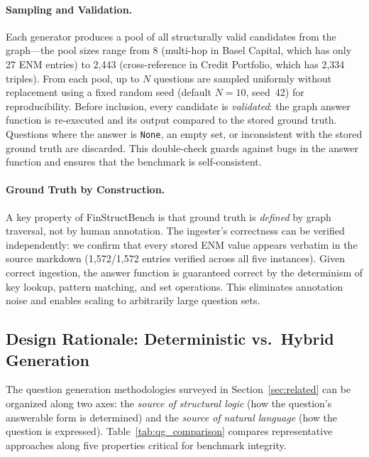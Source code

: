 \documentclass[11pt]{article}
\begin{document}
\paragraph{Sampling and Validation.}
Each generator produces a pool of all structurally valid candidates from
the graph---the pool sizes range from 8 (multi-hop in Basel Capital,
which has only 27 ENM entries) to 2{,}443 (cross-reference in Credit
Portfolio, which has 2{,}334 triples).  From each pool, up to $N$
questions are sampled uniformly without replacement using a fixed random
seed (default $N=10$, seed~42) for reproducibility.  Before inclusion,
every candidate is \emph{validated}: the graph answer function is
re-executed and its output compared to the stored ground truth.
Questions where the answer is \texttt{None}, an empty set, or
inconsistent with the stored ground truth are discarded.  This
double-check guards against bugs in the answer function and ensures
that the benchmark is self-consistent.

\paragraph{Ground Truth by Construction.}
A key property of FinStructBench is that ground truth is \emph{defined} by
graph traversal, not by human annotation.  The ingester's correctness
can be verified independently: we confirm that every stored ENM value
appears verbatim in the source markdown (1{,}572/1{,}572 entries verified
across all five instances).  Given correct ingestion, the answer function
is guaranteed correct by the determinism of key lookup, pattern matching,
and set operations.  This eliminates annotation noise and enables scaling
to arbitrarily large question sets.

\subsection{Design Rationale: Deterministic vs.\ Hybrid Generation}
\label{sec:design_rationale}

The question generation methodologies surveyed in
Section~\ref{sec:related} can be organized along two axes: the
\emph{source of structural logic} (how the question's answerable form is
determined) and the \emph{source of natural language} (how the question
is expressed).  Table~\ref{tab:qg_comparison} compares representative
approaches along five properties critical for benchmark integrity.
\end{document}
